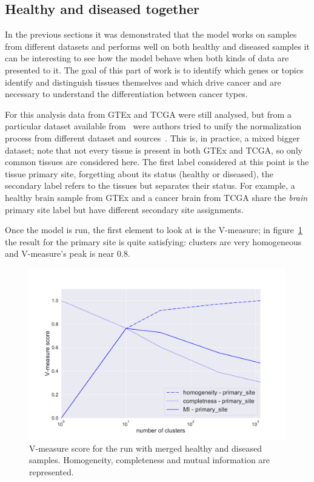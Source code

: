 \subsection{Healthy and diseased together}
In the previous sections it was demonstrated that the model works on samples from different datasets and performs well on both healthy and diseased samples it can be interesting to see how the model behave when both kinds of data are presented to it.
The goal of this part of work is to identify which genes or topics identify and distinguish tissues themselves and which drive cancer and are necessary to understand the differentiation between cancer types.

For this analysis data from GTEx and TCGA were still analysed, but from a particular dataset available from~\cite{Wang2017} were authors tried to unify the normalization process from different dataset and sources~\cite{Betel2018}. This is, in practice, a mixed bigger dataset; note that not every tissue is present in both GTEx and TCGA, so only common tissues are considered here. The first label considered at this point is the tissue primary site, forgetting about its status (healthy or diseased), the secondary label refers to the tissues but separates their status. For example, a healthy brain sample from GTEx and a cancer brain from TCGA share the \textit{brain} primary site label but have different secondary site assignments.

Once the model is run, the first element to look at is the V-measure; in figure~\ref{fig:topic/merged/metric_scores_primarysite} the result for the primary site is quite satisfying: clusters are very homogeneous and V-measure's peak is near $0.8$.
\begin{figure}[htb!]
    \centering
    \includegraphics[width=0.8\linewidth]{pictures/topic/merged/metric_scores_primarysite.pdf}
    \caption{V-measure score for the run with merged healthy and diseased samples. Homogeneity, completeness and mutual information are represented.}
    \label{fig:topic/merged/metric_scores_primarysite}
\end{figure}

